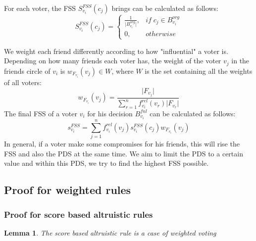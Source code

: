 \documentclass{article}
\newtheorem{lemma}[theorem]{Lemma}
\begin{document}
For each voter, the FSS $ S_{v_i}^{FSS}(c_j)$ brings can be calculated as follows:
\begin{equation} 
       S_{v_i}^{FSS}(c_j) =
        \begin{cases}
        \frac{1}{\vert  B_{v_i}^{org}\vert}, & if \; c_j \in B_{v_i}^{org} \\
        0, &otherwise
        \end{cases}\label{NW:MC}
\end{equation}

We weight each friend differently according to how "influential" a voter is. Depending on how many friends each voter has, the weight of the voter $v_j$ in the friends circle of $v_i$ is $w_{F_{v_i}}(v_j)\in W$, where $W$ is the set containing all the weights of all voters: 
\begin{equation}
w_{F_{v_i}}(v_j)=\frac{\vert F_{v_j}\vert }{\sum_{r=1}^{n}f_{v_i}^{rel}(v_r) \vert F_{v_r} \vert }
\end{equation}
The final FSS of a voter $v_i$ for his decision $B_{v_i}^{fnl}$ can be calculated as follows:
\begin{equation}
s_{v_i}^{FSS}=\sum_{j=1}^{n}f_{v_i}^{rel}(v_j)s_{v_i}^{FSS}(c_j)w_{F_{v_i}}(v_j)
\end{equation}
In general, if a voter make some compromises for his friends, this will rise the FSS and also the PDS at the same time. We aim to limit the PDS to a certain value and within this PDS, we try to find the highest FSS possible.

\subsection{Proof for weighted rules}

\subsubsection{Proof for score based altruistic rules}

\begin{lemma}
The score based altruistic rule is a case of weighted voting    
\end{lemma}
\end{document}
